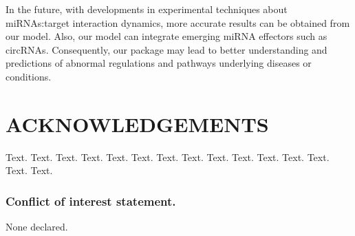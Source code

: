 \documentclass[a4,center,fleqn]{NAR}
\begin{document}
In the future, with developments in experimental techniques about
miRNAs:target interaction dynamics, more accurate results can be
obtained from our model. Also, our model can integrate emerging miRNA
effectors such as circRNAs. Consequently, our package may lead to better
understanding and predictions of abnormal regulations and pathways
underlying diseases or conditions.

\section{ACKNOWLEDGEMENTS}

Text. Text. Text. Text. Text. Text. Text. Text. Text. Text. Text. Text.
Text. Text. Text.

\subsubsection{Conflict of interest statement.}

None declared.

\newpage



\end{document}
